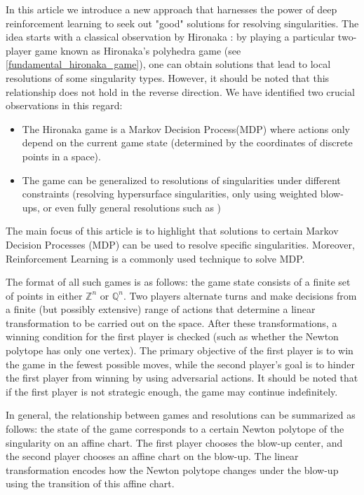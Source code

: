 \documentclass{article}
\theoremstyle{plain}
\theoremstyle{definition}
\theoremstyle{remark}
\begin{document}
In this article we introduce a new approach that harnesses the power of deep reinforcement learning to seek out "good" solutions for resolving singularities. The idea starts with a classical observation by Hironaka \cite{hironaka3}: by playing a particular two-player game known as Hironaka's polyhedra game (see \ref{fundamental_hironaka_game}), one can obtain solutions that lead to local resolutions of some singularity types. However, it should be noted that this relationship does not hold in the reverse direction. We have identified two crucial observations in this regard: 
\begin{itemize}
    \item The Hironaka game is a Markov Decision Process(MDP) where actions only depend on the current game state (determined by the coordinates of discrete points in a space).
    \item The game can be generalized to resolutions of singularities under different constraints (resolving hypersurface singularities, only using weighted blow-ups, or even fully general resolutions such as \cite{hauser1})
\end{itemize}

The main focus of this article is to highlight that solutions to certain Markov Decision Processes (MDP) can be used to resolve specific singularities. Moreover, Reinforcement Learning is a commonly used technique to solve MDP.

The format of all such games is as follows: the game state consists of a finite set of points in either $\mathbb Z^n$ or $\mathbb Q^n$. Two players alternate turns and make decisions from a finite (but possibly extensive) range of actions that determine a linear transformation to be carried out on the space. After these transformations, a winning condition for the first player is checked (such as whether the Newton polytope  has only one vertex). The primary objective of the first player is to win the game in the fewest possible moves, while the second player's goal is to hinder the first player from winning by using adversarial actions. It should be noted that if the first player is not strategic enough, the game may continue indefinitely.

In general, the relationship between games and resolutions can be summarized as follows: the state of the game corresponds to a certain Newton polytope of the singularity on an affine chart. The first player chooses the blow-up center, and the second player chooses an affine chart on the blow-up. The linear transformation encodes how the Newton polytope changes under the blow-up using the transition of this affine chart.
\end{document}
